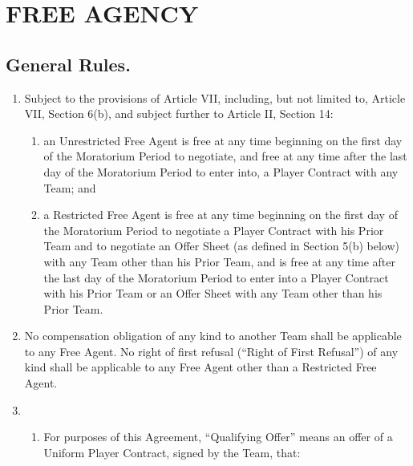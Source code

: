 \documentclass[
]{book}
\providecommand{\tightlist}{%
  \setlength{\itemsep}{0pt}\setlength{\parskip}{0pt}}
\begin{document}
\hypertarget{free-agency}{%
\chapter{FREE AGENCY}\label{free-agency}}

\hypertarget{general-rules.}{%
\section{General Rules.}\label{general-rules.}}

\begin{enumerate}
\def\labelenumi{(\alph{enumi})}
\item
  Subject to the provisions of Article VII, including, but not limited to, Article VII, Section 6(b), and subject further to Article II, Section 14:

  \begin{enumerate}
  \def\labelenumii{(\roman{enumii})}
  \tightlist
  \item
    an Unrestricted Free Agent is free at any time beginning on the first day of the Moratorium Period to negotiate, and free at any time after the last day of the Moratorium Period to enter into, a Player Contract with any Team; and
  \item
    a Restricted Free Agent is free at any time beginning on the first day of the Moratorium Period to negotiate a Player Contract with his Prior Team and to negotiate an Offer Sheet (as defined in Section 5(b) below) with any Team other than his Prior Team, and is free at any time after the last day of the Moratorium Period to enter into a Player Contract with his Prior Team or an Offer Sheet with any Team other than his Prior Team.
  \end{enumerate}
\item
  No compensation obligation of any kind to another Team shall be applicable to any Free Agent. No right of first refusal (``Right of First Refusal'') of any kind shall be applicable to any Free Agent other than a Restricted Free Agent.
\item
  \begin{enumerate}
  \def\labelenumii{(\roman{enumii})}
  \tightlist
  \item
    For purposes of this Agreement, ``Qualifying Offer'' means an offer of a Uniform Player Contract, signed by the Team, that:


\end{enumerate}
\end{enumerate}
\end{document}
